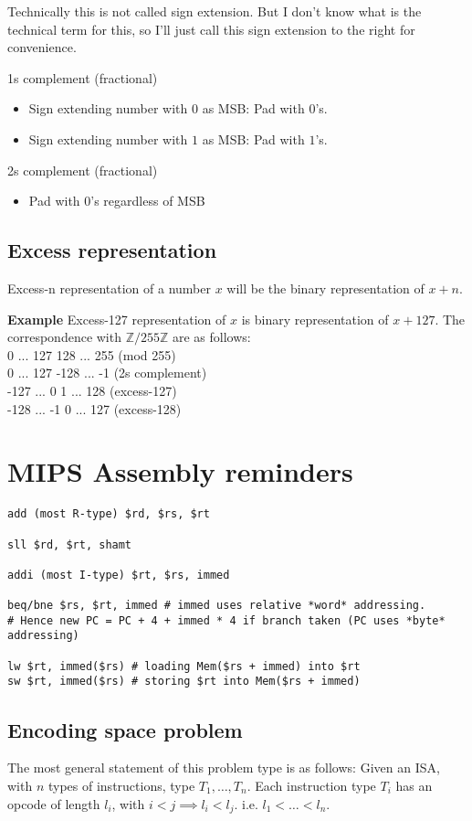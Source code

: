 \documentclass{article}
\begin{document}
Technically this is not called sign extension. But I don't know what is the technical term for this, so I'll just call this sign extension to the right for convenience.


1s complement (fractional)
\begin{itemize}
	\item Sign extending number with $0$ as MSB: Pad with $0$'s.
	\item Sign extending number with $1$ as MSB: Pad with $1$'s.
\end{itemize}

2s complement (fractional)
\begin{itemize}
	\item Pad with $0$'s regardless of MSB
\end{itemize}

\subsection{Excess representation}
Excess-n representation of a number $x$ will be the binary representation of $x+n$.

\textbf{Example} Excess-127 representation of $x$ is binary representation of $x+127$.
The correspondence with $\mathbb{Z}/255\mathbb{Z}$ are as follows:\\
0 ... 127 128 ... 255 (mod 255)\\
0 ... 127 -128 ... -1 (2s complement)\\
-127 ... 0 1 ... 128 (excess-127)\\
-128 ... -1 0 ... 127 (excess-128)

\section{MIPS Assembly reminders}
\begin{verbatim}
add (most R-type) $rd, $rs, $rt

sll $rd, $rt, shamt

addi (most I-type) $rt, $rs, immed

beq/bne $rs, $rt, immed # immed uses relative *word* addressing. 
# Hence new PC = PC + 4 + immed * 4 if branch taken (PC uses *byte* addressing)

lw $rt, immed($rs) # loading Mem($rs + immed) into $rt
sw $rt, immed($rs) # storing $rt into Mem($rs + immed)
\end{verbatim}


\subsection{Encoding space problem}
The most general statement of this problem type is as follows: Given an ISA, with $n$ types of instructions, type $T_1, \dots, T_n$. Each instruction type $T_i$ has an opcode of length $l_i$, with $i < j\implies l_i < l_j$. i.e. $l_1 < \dots < l_n$.
\end{document}
